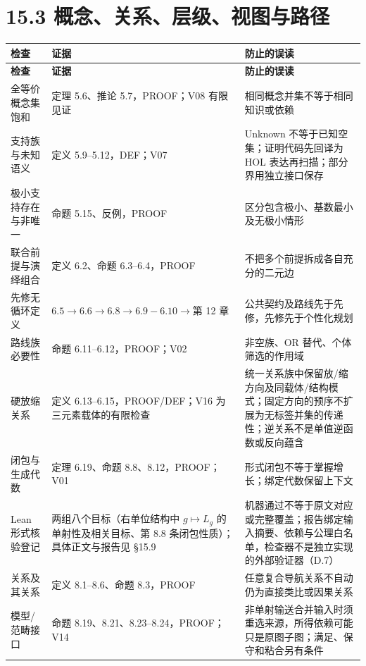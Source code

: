 \documentclass[UTF8,a4paper,zihao=-4,fontset=windows,openany]{ctexbook}
\begin{document}
\section{15.3 概念、关系、层级、视图与路径}
\begingroup\small\setlength{\tabcolsep}{4pt}
\begin{longtable}{>{\raggedright\arraybackslash}p{}>{\raggedright\arraybackslash}p{}>{\raggedright\arraybackslash}p{}}
\toprule
\textbf{检查} & \textbf{证据} & \textbf{防止的误读} \\
\midrule
\endfirsthead
\toprule
\textbf{检查} & \textbf{证据} & \textbf{防止的误读} \\
\midrule
\endhead
\bottomrule
\endfoot
\bottomrule
\endlastfoot
全等价概念集饱和 & 定理 5.6、推论 5.7，PROOF；V08 有限见证 & 相同概念并集不等于相同知识或依赖 \\
支持族与未知语义 & 定义 5.9–5.12，DEF；V07 & Unknown 不等于已知空集；证明代码先回译为 HOL 表达再扫描；部分界用独立接口保存 \\
极小支持存在与非唯一 & 命题 5.15、反例，PROOF & 区分包含极小、基数最小及无极小情形 \\
联合前提与演绎组合 & 定义 6.2、命题 6.3–6.4，PROOF & 不把多个前提拆成各自充分的二元边 \\
先修无循环定义 & \(6.5\to 6.6\to 6.8\to 6.9-6.10\to\)第 12 章 & 公共契约及路线先于先修，先修先于个性化规划 \\
路线族必要性 & 命题 6.11–6.12，PROOF；V02 & 非空族、OR 替代、个体筛选的作用域 \\
硬放缩关系 & 定义 6.13–6.15，PROOF/DEF；V16 为三元素载体的有限检查 & 统一关系族中保留放/缩方向及同载体/结构模式；固定方向的预序不扩展为无标签并集的传递性；逆关系不是单值逆函数或反向蕴含 \\
闭包与生成代数 & 定理 6.19、命题 8.8、8.12，PROOF；V01 & 形式闭包不等于掌握增长；绑定代数保留上下文 \\
Lean 形式核验登记 & 两组八个目标（右单位结构中 \(g\mapsto L_g\) 的单射性及相关目标、第 8.8 条闭包性质）；具体正文与报告见 §15.9 & 机器通过不等于原文对应或完整覆盖；报告绑定输入摘要、依赖与公理白名单，检查器不是独立实现的外部验证器（D.7） \\
关系及其关系 & 定义 8.1–8.6、命题 8.3，PROOF & 任意复合导航关系不自动仍为直接类比或因果关系 \\
模型/范畴接口 & 命题 8.19、8.21、8.23–8.24，PROOF；V14 & 非单射输送合并输入时须重选来源，所得依赖可能只是原图子图；满足、保守和粘合另有条件 \\

\end{longtable}
\end{document}
